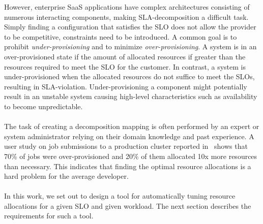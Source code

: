 \noindent However, enterprise SaaS applications have complex architectures consisting of numerous interacting components, making SLA-decomposition a difficult task. Simply finding a configuration that satisfies the SLO does not allow the provider to be competitive, constraints need to be introduced. A common goal is to prohibit \textit{under-provisioning} and to minimize \textit{over-provisioning}. A system is in an over-provisioned state if the amount of allocated resources if greater than the resources required to meet the SLO for the customer. In contrast, a system is under-provisioned when the allocated resources do not suffice to meet the SLOs, resulting in SLA-violation. Under-provisioning a component might potentially result in an unstable system causing high-level characteristics such as availability to become unpredictable.~\cite{al2018elasticity}\\\\
The task of creating a decomposition mapping is often performed by an expert or system administrator relying on their domain knowledge and past experience. A user study on job submissions to a production cluster reported in~\cite{jyothi2016morpheus} shows that 70\% of jobs were over-provisioned and 20\% of them allocated 10x more resources than necessary. This indicates that finding the optimal resource allocations is a hard problem for the average developer. \\\\
In this work, we set out to design a tool for automatically tuning resource allocations for a given SLO and given workload. The next section describes the requirements for such a tool. 
\newpage
